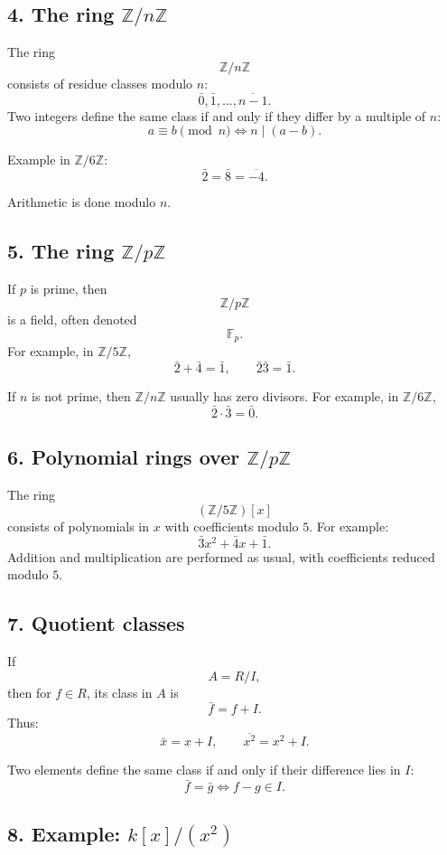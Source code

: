 \documentclass[12pt,a4paper,oneside]{report}
\theoremstyle{notespace}
\begin{document}
	\subsection{4. The ring \(\mathbb Z/n\mathbb Z\)}
	
	The ring
	\[
	\mathbb Z/n\mathbb Z
	\]
	consists of residue classes modulo \(n\):
	\[
	\bar0,\bar1,\dots,\overline{n-1}.
	\]
	Two integers define the same class if and only if they differ by a multiple of \(n\):
	\[
	a\equiv b\pmod n
	\iff
	n\mid (a-b).
	\]
	
	Example in \(\mathbb Z/6\mathbb Z\):
	\[
	\bar2=\bar8=\overline{-4}.
	\]
	
	Arithmetic is done modulo \(n\).
	
	\subsection{5. The ring \(\mathbb Z/p\mathbb Z\)}
	
	If \(p\) is prime, then
	\[
	\mathbb Z/p\mathbb Z
	\]
	is a field, often denoted
	\[
	\mathbb F_p.
	\]
	For example, in \(\mathbb Z/5\mathbb Z\),
	\[
	\bar2+\bar4=\bar1,\qquad \bar2\bar3=\bar1.
	\]
	
	If \(n\) is not prime, then \(\mathbb Z/n\mathbb Z\) usually has zero divisors.
	For example, in \(\mathbb Z/6\mathbb Z\),
	\[
	\bar2\cdot \bar3=\bar0.
	\]
	
	\subsection{6. Polynomial rings over \(\mathbb Z/p\mathbb Z\)}
	
	The ring
	\[
	(\mathbb Z/5\mathbb Z)[x]
	\]
	consists of polynomials in \(x\) with coefficients modulo \(5\). For example:
	\[
	\bar3x^2+\bar4x+\bar1.
	\]
	Addition and multiplication are performed as usual, with coefficients reduced modulo \(5\).
	
	\subsection{7. Quotient classes}
	
	If
	\[
	A=R/I,
	\]
	then for \(f\in R\), its class in \(A\) is
	\[
	\bar f=f+I.
	\]
	Thus:
	\[
	\bar x=x+I,\qquad \overline{x^2}=x^2+I.
	\]
	
	Two elements define the same class if and only if their difference lies in \(I\):
	\[
	\bar f=\bar g
	\iff
	f-g\in I.
	\]
	
	\subsection{8. Example: \(k[x]/(x^2)\)}
	
\end{document}
